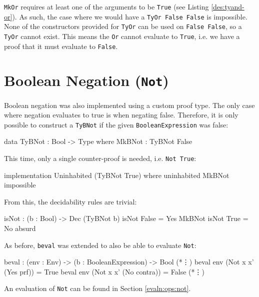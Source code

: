     \texttt{MkOr} requires at least one of the arguments to be \texttt{True} (see Listing \ref{des:tyand-or}). As such, the case where we would have a \texttt{TyOr False False} is impossible. None of the constructors provided for \texttt{TyOr} can be used on \texttt{False False}, so a \texttt{TyOr} cannot exist. This means the \texttt{Or} cannot evaluate to \texttt{True}, i.e. we have a proof that it must evaluate to \texttt{False}.

\section{Boolean Negation (\texttt{Not})}
    Boolean negation was also implemented using a custom proof type. The only case where negation evaluates to true is when negating false. Therefore, it is only possible to construct a \texttt{TyBNot} if the given \texttt{BooleanExpression} was false:
    \begin{code}[caption={The proof type for \texttt{Not}}]
        data TyBNot : Bool -> Type where
            MkBNot  : TyBNot False
    \end{code}
    This time, only a single counter-proof is needed, i.e. \texttt{Not True}:
    \begin{code}[caption={Constructing \texttt{Not True} is impossible}]
        implementation Uninhabited (TyBNot True) where
            uninhabited MkBNot impossible
    \end{code}
    From this, the decidability rules are trivial:
    \begin{code}[caption={Decidability rules for \texttt{Not}}]
        isNot : (b : Bool) -> Dec (TyBNot b)
        isNot False = Yes MkBNot
        isNot True  = No absurd
    \end{code}
    As before, \texttt{beval} was extended to also be able to evaluate \texttt{Not}:
    \begin{code}[caption={\texttt{beval} for \texttt{Not}}, escapeinside={(*}{*)}]
        beval : (env : Env) -> (b : BooleanExpression) -> Bool
            (*\vdots*)
        beval env (Not x x' (Yes prf))   = True
        beval env (Not x x' (No contra)) = False
            (*\vdots*)
    \end{code}
    
    An evaluation of \texttt{Not} can be found in Section \ref{evaln:ops:not}.
    
    
